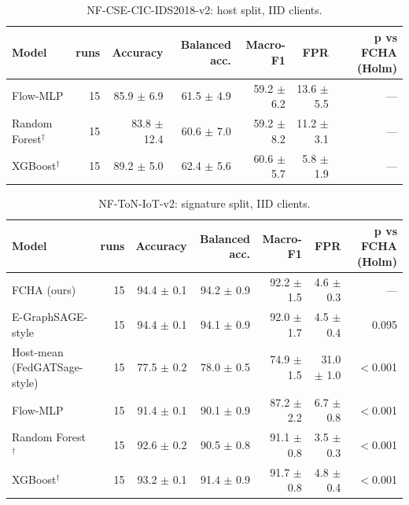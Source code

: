 \begin{table}[t]
\centering
\caption{NF-CSE-CIC-IDS2018-v2: host split, IID clients.}
\label{tab:nf_cse_cic_ids2018_v2_host}
\begin{tabular}{lrrrrrr}
\toprule
Model & runs & Accuracy & Balanced acc. & Macro-F1 & FPR & p vs FCHA (Holm) \\
\midrule
Flow-MLP & 15 & 85.9 $\pm$ 6.9 & 61.5 $\pm$ 4.9 & 59.2 $\pm$ 6.2 & 13.6 $\pm$ 5.5 & — \\
Random Forest$^\dagger$ & 15 & 83.8 $\pm$ 12.4 & 60.6 $\pm$ 7.0 & 59.2 $\pm$ 8.2 & 11.2 $\pm$ 3.1 & — \\
XGBoost$^\dagger$ & 15 & 89.2 $\pm$ 5.0 & 62.4 $\pm$ 5.6 & 60.6 $\pm$ 5.7 & 5.8 $\pm$ 1.9 & — \\
\bottomrule
\end{tabular}
\end{table}

\begin{table}[t]
\centering
\caption{NF-ToN-IoT-v2: signature split, IID clients.}
\label{tab:nf_ton_iot_v2_signature}
\begin{tabular}{lrrrrrr}
\toprule
Model & runs & Accuracy & Balanced acc. & Macro-F1 & FPR & p vs FCHA (Holm) \\
\midrule
FCHA (ours) & 15 & 94.4 $\pm$ 0.1 & 94.2 $\pm$ 0.9 & 92.2 $\pm$ 1.5 & 4.6 $\pm$ 0.3 & — \\
E-GraphSAGE-style & 15 & 94.4 $\pm$ 0.1 & 94.1 $\pm$ 0.9 & 92.0 $\pm$ 1.7 & 4.5 $\pm$ 0.4 & 0.095 \\
Host-mean (FedGATSage-style) & 15 & 77.5 $\pm$ 0.2 & 78.0 $\pm$ 0.5 & 74.9 $\pm$ 1.5 & 31.0 $\pm$ 1.0 & $<$0.001 \\
Flow-MLP & 15 & 91.4 $\pm$ 0.1 & 90.1 $\pm$ 0.9 & 87.2 $\pm$ 2.2 & 6.7 $\pm$ 0.8 & $<$0.001 \\
Random Forest$^\dagger$ & 15 & 92.6 $\pm$ 0.2 & 90.5 $\pm$ 0.8 & 91.1 $\pm$ 0.8 & 3.5 $\pm$ 0.3 & $<$0.001 \\
XGBoost$^\dagger$ & 15 & 93.2 $\pm$ 0.1 & 91.4 $\pm$ 0.9 & 91.7 $\pm$ 0.8 & 4.8 $\pm$ 0.4 & $<$0.001 \\
\bottomrule
\end{tabular}
\end{table}

